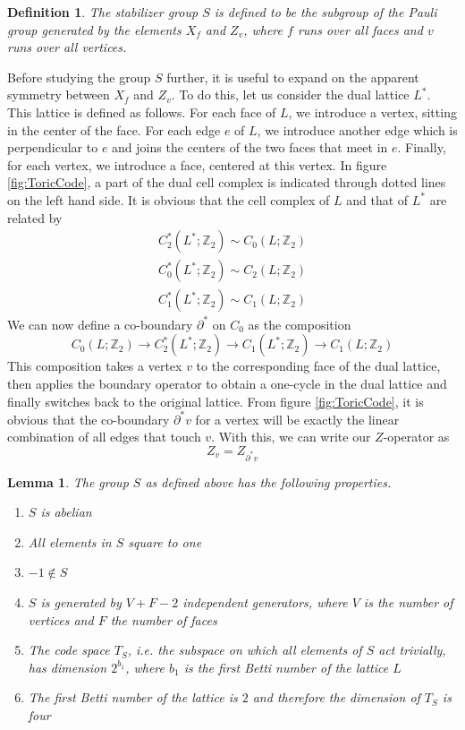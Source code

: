 \documentclass[a4paper, draft]{article}
\theoremstyle{own}
\newtheorem{lem}[thm]{Lemma}
\newtheorem{defn}{Definition}[section]
\theoremstyle{remark}
\newcommand{\Z}{\mathbb{Z}}
\begin{document}
\begin{defn}
The stabilizer group $S$ is defined to be the subgroup of the Pauli group generated by the elements $X_f$ and $Z_v$, where $f$ runs over all faces and $v$ runs over all vertices.
\end{defn}

Before studying the group $S$ further, it is useful to expand on the apparent symmetry between $X_f$ and $Z_v$. To do this, let us consider the dual lattice $L^*$. This lattice is defined as follows. For each face of $L$, we introduce a vertex, sitting in the center of the face. For each edge $e$ of $L$, we introduce another edge which is perpendicular to $e$ and joins the centers of the two faces that meet in $e$. Finally, for each vertex, we introduce a face, centered at this vertex. In figure \ref{fig:ToricCode}, a part of the dual cell complex is indicated through dotted lines on the left hand side. It is obvious that the cell complex of $L$ and that of $L^*$ are related by
\begin{align*}
C_2^*(L^*;\Z_2) \sim C_0(L;\Z_2) \\
C_0^*(L^*;\Z_2) \sim C_2(L;\Z_2) \\
C_1^*(L^*;\Z_2) \sim C_1(L;\Z_2) 
\end{align*}
We can now define a co-boundary $\partial^*$ on $C_0$ as the composition
$$
C_0(L ; \Z_2) \rightarrow C_2^*(L^*; \Z_2) \rightarrow C_1(L^*;\Z_2) \rightarrow C_1(L;\Z_2)
$$
This composition takes a vertex $v$ to the corresponding face of the dual lattice, then applies the boundary operator to obtain a one-cycle in the dual lattice and finally switches back to the original lattice. From figure \ref{fig:ToricCode}, it is obvious that the co-boundary $\partial^* v$ for a vertex will be exactly the linear combination of all edges that touch $v$. With this, we can write our $Z$-operator as
$$
Z_v = Z_{\partial^* v}
$$

\begin{lem}
The group $S$ as defined above has the following properties.
\begin{enumerate}
	\item $S$ is abelian
	\item All elements in $S$ square to one
	\item $-1 \notin S$
	\item $S$ is generated by $V + F - 2$ independent generators, where $V$ is the number of vertices and $F$ the number of faces
	\item The code space $T_S$, i.e. the subspace on which all elements of $S$ act trivially, has dimension $2^{b_1}$, where $b_1$ is the first Betti number of the lattice $L$
	\item The first Betti number of the lattice is $2$ and therefore the dimension of $T_S$ is four
\end{enumerate}
\end{lem}
\end{document}
